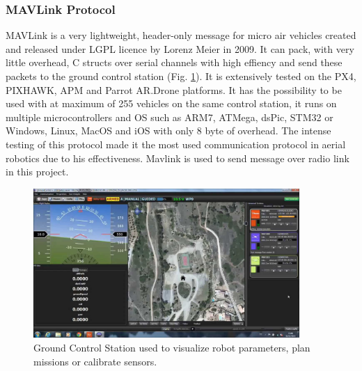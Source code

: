 \subsubsection{MAVLink Protocol}
\label{sec:mavlink}
MAVLink is a very lightweight, header-only message for micro air vehicles created and released under LGPL licence by Lorenz Meier in 2009.
It can pack, with very little overhead, C structs over serial channels with high effiency and send these packets to the ground control station (Fig. \ref{figure:controlstation}). It is extensively tested on the PX4, PIXHAWK, APM and Parrot AR.Drone platforms. It has the possibility to be used with at maximum of 255 vehicles on the same control station, it runs on multiple microcontrollers and OS such as  ARM7, ATMega, dsPic, STM32 or Windows, Linux, MacOS and iOS with only 8 byte of overhead. The intense testing of this protocol made it the most used communication protocol in aerial robotics due to his effectiveness. Mavlink is used to send message over radio link in this project.
\begin{figure}[H]
 \centering
 \includegraphics[width=0.9\textwidth]{groundcontrol.jpg}
 \caption[Ground Control Station]{Ground Control Station used to visualize robot parameters, plan missions or calibrate sensors.}
 \label{figure:controlstation}
\end{figure}


